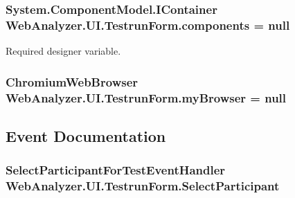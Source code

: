 \subsubsection[{components}]{\setlength{\rightskip}{0pt plus 5cm}System.\+Component\+Model.\+I\+Container Web\+Analyzer.\+U\+I.\+Testrun\+Form.\+components = null\hspace{0.3cm}{\ttfamily [private]}}\label{class_web_analyzer_1_1_u_i_1_1_testrun_form_a90f322118f120fb4bcc772f1d939d918}


Required designer variable. 

\hypertarget{class_web_analyzer_1_1_u_i_1_1_testrun_form_a8a98c5bfb1ce075cd3fbeadeb40f51fd}{}
\subsubsection[{my\+Browser}]{\setlength{\rightskip}{0pt plus 5cm}Chromium\+Web\+Browser Web\+Analyzer.\+U\+I.\+Testrun\+Form.\+my\+Browser = null\hspace{0.3cm}{\ttfamily [private]}}\label{class_web_analyzer_1_1_u_i_1_1_testrun_form_a8a98c5bfb1ce075cd3fbeadeb40f51fd}


\subsection{Event Documentation}
\hypertarget{class_web_analyzer_1_1_u_i_1_1_testrun_form_a18eca3a8ed7f598778799921d9564428}{}
\subsubsection[{Select\+Participant}]{\setlength{\rightskip}{0pt plus 5cm}Select\+Participant\+For\+Test\+Event\+Handler Web\+Analyzer.\+U\+I.\+Testrun\+Form.\+Select\+Participant}\label{class_web_analyzer_1_1_u_i_1_1_testrun_form_a18eca3a8ed7f598778799921d9564428}
\hypertarget{class_web_analyzer_1_1_u_i_1_1_testrun_form_ac07b8e3d6b66e219b067dcacd1535f2c}{}
